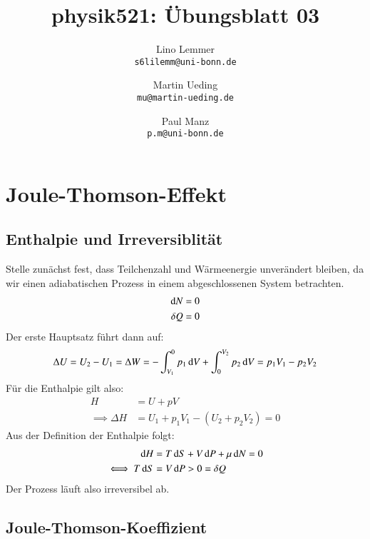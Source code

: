 

\setcounter{section}{1}
\renewcommand\thesection{H\,3.\arabic{section}}
\renewcommand\thesubsection{\thesection.\alph{subsection}}

\title{physik521: Übungsblatt 03}
\author{%
    Lino Lemmer \\ \small{\texttt{s6lilemm@uni-bonn.de}}
    \and
    Martin Ueding \\ \small{\texttt{mu@martin-ueding.de}}
    \and
    Paul Manz \\ \small{\texttt{p.m@uni-bonn.de}}
}


\maketitle

\section{Joule-Thomson-Effekt}
\subsection{Enthalpie und Irreversiblität}
Stelle zunächst fest, dass Teilchenzahl und Wärmeenergie unverändert bleiben, da wir einen adiabatischen Prozess in einem abgeschlossenen System betrachten.
\begin{align*}
\dif N &= 0 \\
\delta Q &= 0 \\
\end{align*}
Der erste Hauptsatz führt dann auf:
\[ \Delta U = U_2 - U_1 = \Delta W = -\int_{V_1}^{0} p_1 \dif V  + \int_{0}^{V_2} p_2 \dif V= p_1 V_1 - p_2 V_2 \]
Für die Enthalpie gilt also:
\begin{align*}
H &= U+pV \\
\implies \Delta H &= U_1 + p_1 V_1 - (U_2 + p_2 V_2) =0 
\end{align*}  
Aus der Definition der Enthalpie folgt:
\begin{align*}
\dif H &= T \dif S + V \dif P + \mu \dif N = 0 \\
\iff T \dif S &= V \dif P > 0 = \delta Q \\
\end{align*}
Der Prozess läuft also irreversibel ab.

\subsection{Joule-Thomson-Koeffizient}



